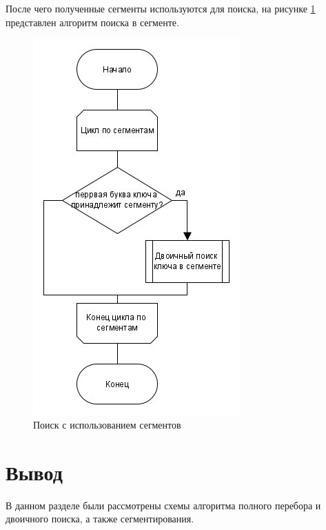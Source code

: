 После чего полученные сегменты используются для поиска, на рисунке \ref{fig:segsearch} представлен алгоритм поиска в сегменте.
\begin{figure}
	\centering
	\includegraphics[width=0.5\linewidth]{src/segsearch}
	\caption{Поиск с использованием сегментов}
	\label{fig:segsearch}
\end{figure}


\section{Вывод}
В данном разделе были рассмотрены схемы алгоритма полного перебора и двоичного поиска, а также сегментирования.